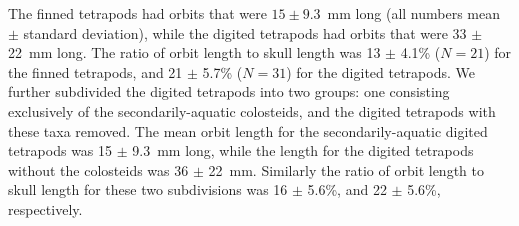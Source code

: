  The finned tetrapods had orbits that were $15 \pm 9.3$~mm long (all numbers mean $\pm$ standard deviation), while the digited tetrapods had orbits that were 33 $\pm$ 22~mm long. The ratio of orbit length to skull length was 13 $\pm$ 4.1\% ($N=21$) for the finned tetrapods, and 21 $\pm$  5.7\% ($N=31$) for the digited tetrapods. We further subdivided the digited tetrapods into two groups: one consisting exclusively of the secondarily-aquatic colosteids, and the digited tetrapods with these taxa removed. The mean orbit length for the secondarily-aquatic digited tetrapods was 15 $\pm$ 9.3~mm long, while the length for the digited tetrapods without the colosteids was 36 $\pm$ 22~mm. Similarly the ratio of orbit length to skull length for these two subdivisions was 16 $\pm$ 5.6\%, and 22 $\pm$ 5.6\%, respectively.